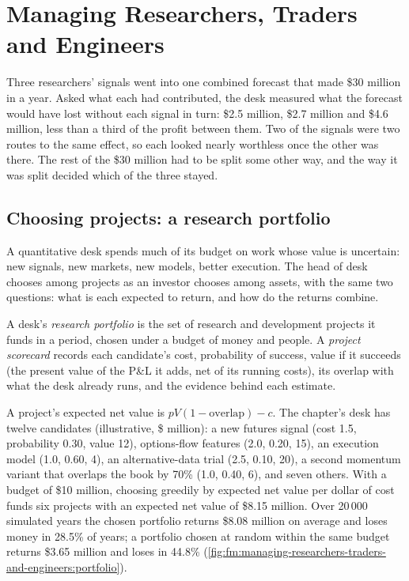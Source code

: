 \chapter{Managing Researchers, Traders and Engineers}\label{ch:fm:managing-researchers-traders-and-engineers}

Three researchers' signals went into one combined forecast that made \$30 million in a year. Asked what each had contributed, the desk measured
what the forecast would have lost without each signal in turn: \$2.5 million, \$2.7 million and \$4.6 million, less than a third of the profit
between them. Two of the signals were two routes to the same effect, so each looked nearly worthless once the other was there. The rest of the
\$30 million had to be split some other way, and the way it was split decided which of the three stayed.

\section{Choosing projects: a research portfolio}

A quantitative desk spends much of its budget on work whose value is uncertain: new signals, new markets, new models, better execution. The
head of desk chooses among projects as an investor chooses among assets, with the same two questions: what is each expected to return, and how do
the returns combine.

\begin{definition}\label{def:fm:managing-researchers-traders-and-engineers:portfolio}
A desk's \emph{research portfolio} is the set of research and development projects it funds in a period, chosen under a
budget of money and people. A \emph{project scorecard} records each candidate's cost, probability of success, value if
it succeeds (the present value of the P\&L it adds, net of its running costs), its overlap with what the desk already runs, and the evidence
behind each estimate.
\end{definition}

A project's expected net value is $pV(1-\text{overlap})-c$. The chapter's desk has twelve candidates (illustrative, \$ million): a new futures
signal (cost 1.5, probability 0.30, value 12), options-flow features (2.0, 0.20, 15), an execution model (1.0, 0.60, 4), an alternative-data trial
(2.5, 0.10, 20), a second momentum variant that overlaps the book by 70\% (1.0, 0.40, 6), and seven others. With a budget of \$10 million, choosing
greedily by expected net value per dollar of cost funds six projects with an expected net value of \$8.15 million. Over 20\,000 simulated years
the chosen portfolio returns \$8.08 million on average and loses money in 28.5\% of years; a portfolio chosen at random within the same budget
returns \$3.65 million and loses in 44.8\% (\cref{fig:fm:managing-researchers-traders-and-engineers:portfolio}).

